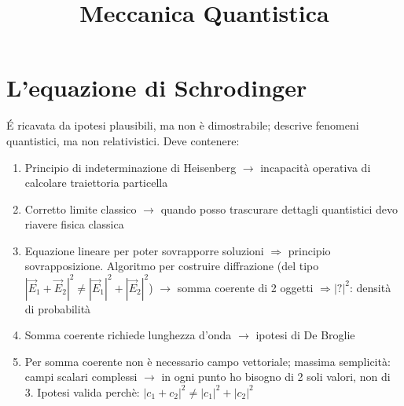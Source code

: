 


    \pagecolor{black}
    \color{white}

	\title{Meccanica Quantistica}
	\maketitle
	\tableofcontents
	\newpage
	




\chapter{L'equazione di Schrodinger}
\'E ricavata da ipotesi plausibili, ma non è dimostrabile; descrive fenomeni quantistici, ma non relativistici. \newline
Deve contenere: 
\begin{enumerate}
    \item Principio di indeterminazione di Heisenberg $\rightarrow$ incapacità operativa di calcolare traiettoria particella
    \item Corretto limite classico $\rightarrow$ quando posso trascurare dettagli quantistici devo riavere fisica classica
    \item Equazione lineare per poter sovrapporre soluzioni $\Rightarrow$ principio sovrapposizione. Algoritmo per costruire diffrazione (del tipo ${|\vec{E}_1 + \vec{E}_2|}^2 \neq {|\vec{E}_1|}^2 + {|\vec{E}_2|}^2$) $\rightarrow$ somma coerente di 2 oggetti $\Rightarrow {|?|}^2$: densità di probabilità
    \item Somma coerente richiede lunghezza d'onda $\rightarrow$ ipotesi di De Broglie
    \item Per somma coerente non è necessario campo vettoriale; massima semplicità: campi scalari complessi $\rightarrow$ in ogni punto ho bisogno di 2 soli valori, non di 3. Ipotesi valida perchè: ${|c_1 + c_2|}^2 \neq {|c_1|}^2 + {|c_2|}^2$
\end{enumerate}

